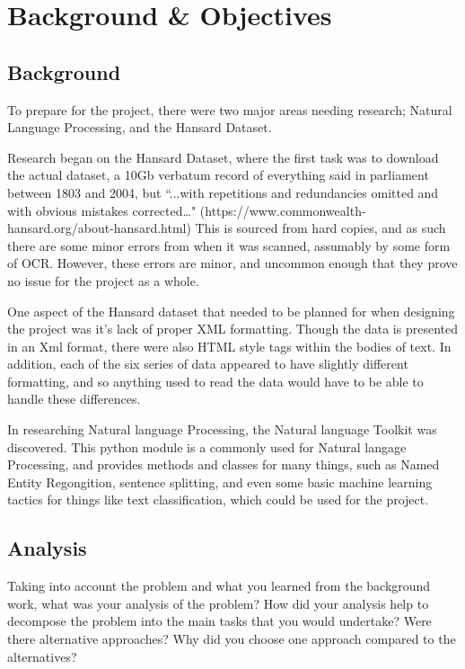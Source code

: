 \chapter{Background \& Objectives}

\section{Background}
To prepare for the project, there were two major areas needing research; Natural Language Processing, and the Hansard Dataset.

Research began on the Hansard Dataset, where the first task was to download the actual dataset, a 10Gb verbatum record of everything said in parliament between 1803 and 2004, but “...with repetitions and redundancies omitted and with obvious mistakes corrected…" (https://www.commonwealth-hansard.org/about-hansard.html)
This is sourced from hard copies, and as such there are some minor errors from when it was scanned, assumably by some form of OCR. However, these errors are minor, and uncommon enough that they prove no issue for the project as a whole.

One aspect of the Hansard dataset that needed to be planned for when designing the project was it’s lack of proper XML formatting. Though the data is presented in an Xml format, there were also HTML style tags within the bodies of text. In addition, each of the six series of data appeared to have slightly different formatting, and so anything used to read the data would have to be able to handle these differences.

In researching Natural language Processing, the Natural language Toolkit was discovered. This python module is a commonly used for Natural langage Processing, and provides methods and classes for many things, such as Named Entity Regongition, sentence splitting, and even some basic machine learning tactics for things like text classification, which could be used for the project. 

\section{Analysis}
Taking into account the problem and what you learned from the background work, what was your analysis of the problem? How did your analysis help to decompose the problem into the main tasks that you would undertake? Were there alternative approaches? Why did you choose one approach compared to the alternatives? 

